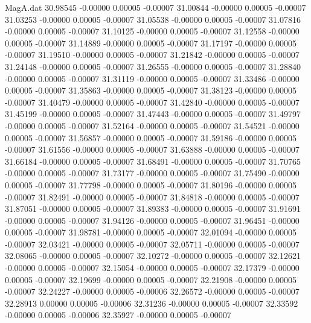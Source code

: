 \begin{filecontents}{MagA.dat}
  30.98545   -0.00000    0.00005   -0.00007
  31.00844   -0.00000    0.00005   -0.00007
  31.03253   -0.00000    0.00005   -0.00007
  31.05538   -0.00000    0.00005   -0.00007
  31.07816   -0.00000    0.00005   -0.00007
  31.10125   -0.00000    0.00005   -0.00007
  31.12558   -0.00000    0.00005   -0.00007
  31.14889   -0.00000    0.00005   -0.00007
  31.17197   -0.00000    0.00005   -0.00007
  31.19510   -0.00000    0.00005   -0.00007
  31.21842   -0.00000    0.00005   -0.00007
  31.24148   -0.00000    0.00005   -0.00007
  31.26555   -0.00000    0.00005   -0.00007
  31.28840   -0.00000    0.00005   -0.00007
  31.31119   -0.00000    0.00005   -0.00007
  31.33486   -0.00000    0.00005   -0.00007
  31.35863   -0.00000    0.00005   -0.00007
  31.38123   -0.00000    0.00005   -0.00007
  31.40479   -0.00000    0.00005   -0.00007
  31.42840   -0.00000    0.00005   -0.00007
  31.45199   -0.00000    0.00005   -0.00007
  31.47443   -0.00000    0.00005   -0.00007
  31.49797   -0.00000    0.00005   -0.00007
  31.52164   -0.00000    0.00005   -0.00007
  31.54521   -0.00000    0.00005   -0.00007
  31.56857   -0.00000    0.00005   -0.00007
  31.59186   -0.00000    0.00005   -0.00007
  31.61556   -0.00000    0.00005   -0.00007
  31.63888   -0.00000    0.00005   -0.00007
  31.66184   -0.00000    0.00005   -0.00007
  31.68491   -0.00000    0.00005   -0.00007
  31.70765   -0.00000    0.00005   -0.00007
  31.73177   -0.00000    0.00005   -0.00007
  31.75490   -0.00000    0.00005   -0.00007
  31.77798   -0.00000    0.00005   -0.00007
  31.80196   -0.00000    0.00005   -0.00007
  31.82491   -0.00000    0.00005   -0.00007
  31.84818   -0.00000    0.00005   -0.00007
  31.87051   -0.00000    0.00005   -0.00007
  31.89383   -0.00000    0.00005   -0.00007
  31.91691   -0.00000    0.00005   -0.00007
  31.94126   -0.00000    0.00005   -0.00007
  31.96451   -0.00000    0.00005   -0.00007
  31.98781   -0.00000    0.00005   -0.00007
  32.01094   -0.00000    0.00005   -0.00007
  32.03421   -0.00000    0.00005   -0.00007
  32.05711   -0.00000    0.00005   -0.00007
  32.08065   -0.00000    0.00005   -0.00007
  32.10272   -0.00000    0.00005   -0.00007
  32.12621   -0.00000    0.00005   -0.00007
  32.15054   -0.00000    0.00005   -0.00007
  32.17379   -0.00000    0.00005   -0.00007
  32.19699   -0.00000    0.00005   -0.00007
  32.21908   -0.00000    0.00005   -0.00007
  32.24227   -0.00000    0.00005   -0.00006
  32.26572   -0.00000    0.00005   -0.00007
  32.28913    0.00000    0.00005   -0.00006
  32.31236   -0.00000    0.00005   -0.00007
  32.33592   -0.00000    0.00005   -0.00006
  32.35927   -0.00000    0.00005   -0.00007

\end{filecontents}
